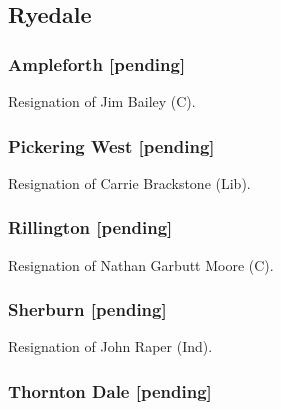 \documentclass[a4paper,openany]{book}
\begin{document}
\begin{resultsiii}
\subsection*{Ryedale}

\subsubsection*{Ampleforth \hspace*{\fill}\nolinebreak[1]%
	\enspace\hspace*{\fill}
	[pending]}


Resignation of Jim Bailey (C).

\subsubsection*{Pickering West \hspace*{\fill}\nolinebreak[1]%
	\enspace\hspace*{\fill}
	[pending]}


Resignation of Carrie Brackstone (Lib).

\subsubsection*{Rillington \hspace*{\fill}\nolinebreak[1]%
	\enspace\hspace*{\fill}
	[pending]}


Resignation of Nathan Garbutt Moore (C).

\subsubsection*{Sherburn \hspace*{\fill}\nolinebreak[1]%
	\enspace\hspace*{\fill}
	[pending]}


Resignation of John Raper (Ind).

\subsubsection*{Thornton Dale \hspace*{\fill}\nolinebreak[1]%
	\enspace\hspace*{\fill}
	[pending]}


\end{resultsiii}
\end{document}
